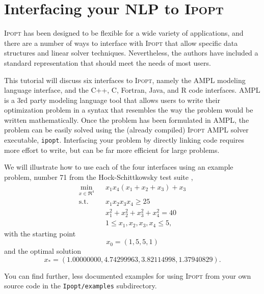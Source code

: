 \documentclass[10pt]{article}
\newcommand{\Ipopt}{\textsc{Ipopt}\xspace}
\begin{document}
\section{Interfacing your NLP to \Ipopt}
\label{sec:tutorial-example}

\Ipopt has been designed to be flexible for a wide variety of
applications, and there are a number of ways to interface with \Ipopt
that allow specific data structures and linear solver
techniques. Nevertheless, the authors have included a standard
representation that should meet the needs of most users.

This tutorial will discuss six interfaces to \Ipopt, namely the AMPL
modeling language \cite{FouGayKer:AMPLbook} interface, and the C++, C,
Fortran, Java, and R code interfaces.  AMPL is a 3rd party modeling language
tool that allows users to write their optimization problem in a syntax
that resembles the way the problem would be written mathematically.
Once the problem has been formulated in AMPL, the problem can be
easily solved using the (already compiled) \Ipopt AMPL solver
executable, {\tt ipopt}. Interfacing your problem by directly linking
code requires more effort to write, but can be far more efficient for
large problems.

We will illustrate how to use each of the four interfaces using an
example problem, number 71 from the Hock-Schittkowsky test suite \cite{HS},
  \begin{eqnarray}
    \min_{x \in \Re^4} &&x_1 x_4 (x_1 + x_2 + x_3)  +  x_3 \label{eq:ex_obj} \\
    \mbox{s.t.}  &&x_1 x_2 x_3 x_4 \ge 25 \label{eq:ex_ineq} \\
    &&x_1^2 + x_2^2 + x_3^2 + x_4^2  =  40 \label{eq:ex_equ} \\
    &&1 \leq x_1, x_2, x_3, x_4 \leq 5, \label{eq:ex_bounds}
  \end{eqnarray}
with the starting point
\begin{equation}
x_0 = (1, 5, 5, 1) \label{eq:ex_startpt}
\end{equation}
and the optimal solution
\[
x_* = (1.00000000, 4.74299963, 3.82114998, 1.37940829). \nonumber
\]

You can find further, less documented examples for using \Ipopt from
your own source code in the {\tt Ipopt/examples} subdirectory.
\end{document}

